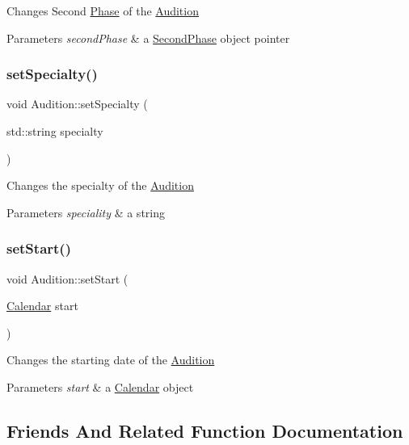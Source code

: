 Changes Second \hyperlink{class_phase}{Phase} of the \hyperlink{class_audition}{Audition} 
\begin{DoxyParams}{Parameters}
{\em second\+Phase} & a \hyperlink{class_second_phase}{Second\+Phase} object pointer \\
\hline
\end{DoxyParams}
\mbox{\label{class_audition_a708f47023fbf0d1d740cda888583b2bd}} 
\subsubsection{\texorpdfstring{set\+Specialty()}{setSpecialty()}}
{\footnotesize\ttfamily void Audition\+::set\+Specialty (\begin{DoxyParamCaption}\item[{std\+::string}]{specialty }\end{DoxyParamCaption})}

Changes the specialty of the \hyperlink{class_audition}{Audition} 
\begin{DoxyParams}{Parameters}
{\em speciality} & a string \\
\hline
\end{DoxyParams}
\mbox{\label{class_audition_a65f617b37f5a3a65f37ad68e8a293e15}} 
\subsubsection{\texorpdfstring{set\+Start()}{setStart()}}
{\footnotesize\ttfamily void Audition\+::set\+Start (\begin{DoxyParamCaption}\item[{\hyperlink{class_calendar}{Calendar}}]{start }\end{DoxyParamCaption})}

Changes the starting date of the \hyperlink{class_audition}{Audition} 
\begin{DoxyParams}{Parameters}
{\em start} & a \hyperlink{class_calendar}{Calendar} object \\
\hline
\end{DoxyParams}


\subsection{Friends And Related Function Documentation}
\mbox{\label{class_audition_a67ea98e4a54230ec3836fea39695ff8d}} 

